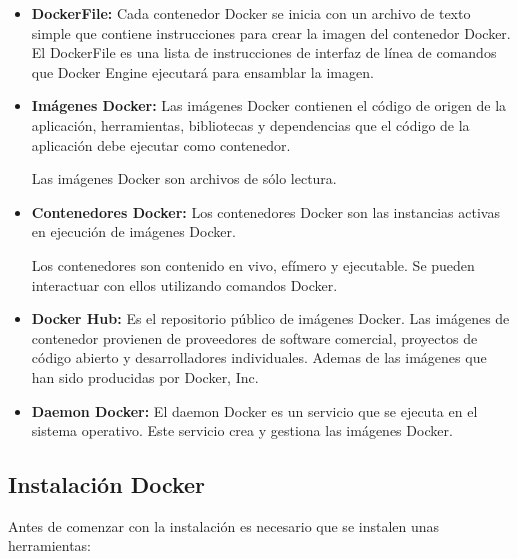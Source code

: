 			\begin{itemize}
					
				\item \textbf{DockerFile:} Cada contenedor Docker se inicia con un archivo de texto simple que contiene instrucciones para crear la imagen del contenedor Docker. El DockerFile es una lista de instrucciones de interfaz de línea de comandos que Docker Engine ejecutará para ensamblar la imagen.
				
				\item \textbf{Imágenes Docker:} Las imágenes Docker contienen el código de origen de la aplicación, herramientas, bibliotecas y dependencias que el código de la aplicación debe ejecutar como contenedor.\par
				
				Las imágenes Docker son archivos de sólo lectura.
				
				\item \textbf{Contenedores Docker:} Los contenedores Docker son las instancias activas en ejecución de imágenes Docker.\par
				 
				Los contenedores son contenido en vivo, efímero y ejecutable. Se pueden interactuar con ellos utilizando comandos Docker.
				
				\item \textbf{Docker Hub:} Es el repositorio público de imágenes Docker. Las imágenes de contenedor provienen de proveedores de software comercial, proyectos de código abierto y desarrolladores individuales. Ademas de las imágenes que han sido producidas por Docker, Inc.\par
				
				\item \textbf{Daemon Docker:} El daemon Docker es un servicio que se ejecuta en el sistema operativo. Este servicio crea y gestiona las imágenes Docker.
				

			\end{itemize}
		
		
		\subsection{Instalación Docker}
			
			\vspace{0.1cm}
			
			Antes de comenzar con la instalación es necesario que se instalen unas herramientas:
					

